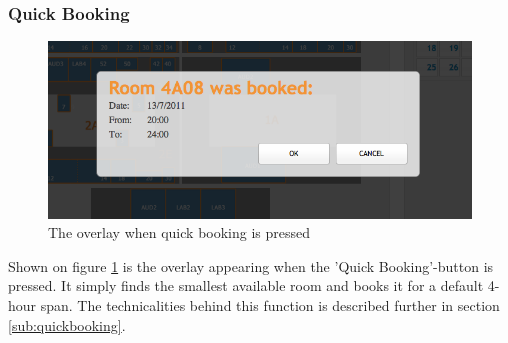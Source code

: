 \subsubsection*{Quick Booking}
\begin{figure}[htb]
\begin{center}
\leavevmode
\includegraphics[width=1\textwidth]{images/quick_booking}
\end{center}
\caption{The overlay when quick booking is pressed}
\label{fig:quick_overlay}
\end{figure}
Shown on figure \ref{fig:quick_overlay} is the overlay appearing when the 'Quick Booking'-button is pressed.
It simply finds the smallest available room and books it for a default 4-hour span. The technicalities behind this function is described further in section \ref{sub:quickbooking}.

\pagebreak
